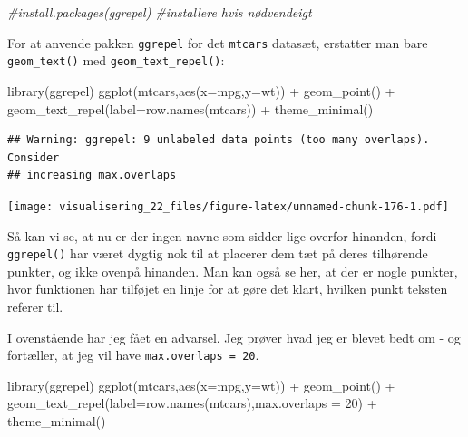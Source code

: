 \documentclass[
]{book}
\newenvironment{Shaded}{\begin{snugshade}}{\end{snugshade}}
\newcommand{\AttributeTok}[1]{\textcolor[rgb]{0.77,0.63,0.00}{#1}}
\newcommand{\CommentTok}[1]{\textcolor[rgb]{0.56,0.35,0.01}{\textit{#1}}}
\newcommand{\DecValTok}[1]{\textcolor[rgb]{0.00,0.00,0.81}{#1}}
\newcommand{\FunctionTok}[1]{\textcolor[rgb]{0.00,0.00,0.00}{#1}}
\newcommand{\NormalTok}[1]{#1}
\newcommand{\SpecialCharTok}[1]{\textcolor[rgb]{0.00,0.00,0.00}{#1}}
\begin{document}
\begin{Shaded}
\begin{Highlighting}[]
\CommentTok{\#install.packages(ggrepel) \#installere hvis nødvendeigt}
\end{Highlighting}
\end{Shaded}

For at anvende pakken \texttt{ggrepel} for det \texttt{mtcars} datasæt, erstatter man bare \texttt{geom\_text()} med \texttt{geom\_text\_repel()}:

\begin{Shaded}
\begin{Highlighting}[]
\FunctionTok{library}\NormalTok{(ggrepel)}
\FunctionTok{ggplot}\NormalTok{(mtcars,}\FunctionTok{aes}\NormalTok{(}\AttributeTok{x=}\NormalTok{mpg,}\AttributeTok{y=}\NormalTok{wt)) }\SpecialCharTok{+} 
  \FunctionTok{geom\_point}\NormalTok{() }\SpecialCharTok{+}
  \FunctionTok{geom\_text\_repel}\NormalTok{(}\AttributeTok{label=}\FunctionTok{row.names}\NormalTok{(mtcars)) }\SpecialCharTok{+} 
  \FunctionTok{theme\_minimal}\NormalTok{()}
\end{Highlighting}
\end{Shaded}

\begin{verbatim}
## Warning: ggrepel: 9 unlabeled data points (too many overlaps). Consider
## increasing max.overlaps
\end{verbatim}

\texttt{[image: visualisering\_22\_files/figure-latex/unnamed-chunk-176-1.pdf]}

Så kan vi se, at nu er der ingen navne som sidder lige overfor hinanden, fordi \texttt{ggrepel()} har været dygtig nok til at placerer dem tæt på deres tilhørende punkter, og ikke ovenpå hinanden. Man kan også se her, at der er nogle punkter, hvor funktionen har tilføjet en linje for at gøre det klart, hvilken punkt teksten referer til.

I ovenstående har jeg fået en advarsel. Jeg prøver hvad jeg er blevet bedt om - og fortæller, at jeg vil have \texttt{max.overlaps\ =\ 20}.

\begin{Shaded}
\begin{Highlighting}[]
\FunctionTok{library}\NormalTok{(ggrepel)}
\FunctionTok{ggplot}\NormalTok{(mtcars,}\FunctionTok{aes}\NormalTok{(}\AttributeTok{x=}\NormalTok{mpg,}\AttributeTok{y=}\NormalTok{wt)) }\SpecialCharTok{+} 
  \FunctionTok{geom\_point}\NormalTok{() }\SpecialCharTok{+}
  \FunctionTok{geom\_text\_repel}\NormalTok{(}\AttributeTok{label=}\FunctionTok{row.names}\NormalTok{(mtcars),}\AttributeTok{max.overlaps =} \DecValTok{20}\NormalTok{) }\SpecialCharTok{+}
  \FunctionTok{theme\_minimal}\NormalTok{()}
\end{Highlighting}
\end{Shaded}
\end{document}
